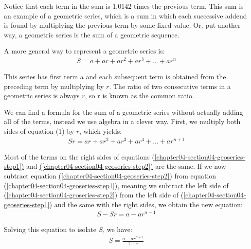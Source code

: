 \documentclass[10pt,]{book}
\theoremstyle{plain}
\theoremstyle{definition}
\theoremstyle{definition}
\theoremstyle{definition}
\numberwithin{equation}{section}
\begin{document}
Notice that each term in the sum is \(1.0142\) times the previous term. This sum is an example of a geometric series, which is a sum in which each successive addend is found by multiplying the previous term by some fixed value. Or, put another way, a geometric series is the sum of a geometric sequence.%
\par
\hypertarget{p-141}{}%
A more general way to represent a geometric series is:%
\begin{gather}
S = a + ar + ar^2 + ar^3 + ... + ar^n\label{chapter04-section04-geoseries-step1}
\end{gather}
%
\par
\hypertarget{p-142}{}%
This series has first term a and each subsequent term is obtained from the preceding term by multiplying by \(r\). The ratio of two consecutive terms in a geometric series is always \(r\), so r is known as the common ratio.%
\par
\hypertarget{p-143}{}%
We can find a formula for the sum of a geometric series without actually adding all of the terms, instead we use algebra in a clever way.  First, we multiply both sides of equation (1) by \(r\), which yields:%
\begin{gather}
Sr = ar + ar^2 + ar^3 + ar^4 + ... + ar^{n+1}\label{chapter04-section04-geoseries-step2}
\end{gather}
%
\par
\hypertarget{p-144}{}%
Most of the terms on the right sides of equations \hyperref[chapter04-section04-geoseries-step1]{(\ref{chapter04-section04-geoseries-step1})} and \hyperref[chapter04-section04-geoseries-step2]{(\ref{chapter04-section04-geoseries-step2})} are the same.  If we now subtract equation \hyperref[chapter04-section04-geoseries-step2]{(\ref{chapter04-section04-geoseries-step2})} from equation \hyperref[chapter04-section04-geoseries-step1]{(\ref{chapter04-section04-geoseries-step1})}, meaning we subtract the left side of \hyperref[chapter04-section04-geoseries-step2]{(\ref{chapter04-section04-geoseries-step2})} from the left side of \hyperref[chapter04-section04-geoseries-step1]{(\ref{chapter04-section04-geoseries-step1})} and the same with the right sides, we obtain the new equation:%
\begin{gather*}
S-Sr = a - ar^{n+1}
\end{gather*}
%
\par
\hypertarget{p-145}{}%
Solving this equation to isolate \(S\), we have:%
\begin{gather}
S = \frac{a-ar^{n+1}}{1-r}\label{chapter04-section04-geoseries-step3}
\end{gather}
\end{document}
